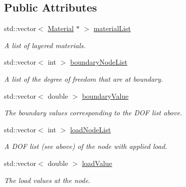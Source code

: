 \subsection*{Public Attributes}
\begin{DoxyCompactItemize}
\item 
\mbox{\label{class_mesh_acc363bc0df381350540ed9d56ba3b35b}} 
std\+::vector$<$ \mbox{\hyperlink{class_material}{Material}} $\ast$ $>$ \mbox{\hyperlink{class_mesh_acc363bc0df381350540ed9d56ba3b35b}{material\+List}}
\begin{DoxyCompactList}\small\item\em A list of layered materials. \end{DoxyCompactList}\item 
std\+::vector$<$ int $>$ \mbox{\hyperlink{class_mesh_a5a1c5739ef85c8f9071f689e790b5251}{boundary\+Node\+List}}
\begin{DoxyCompactList}\small\item\em A list of the degree of freedom that are at boundary. \end{DoxyCompactList}\item 
\mbox{\label{class_mesh_ab331f3e3efeb2934c202b07db8a6c1a5}} 
std\+::vector$<$ double $>$ \mbox{\hyperlink{class_mesh_ab331f3e3efeb2934c202b07db8a6c1a5}{boundary\+Value}}
\begin{DoxyCompactList}\small\item\em The boundary values corresponding to the D\+OF list above. \end{DoxyCompactList}\item 
\mbox{\label{class_mesh_ad54254084b97877bb4d0f9d9d9cbb380}} 
std\+::vector$<$ int $>$ \mbox{\hyperlink{class_mesh_ad54254084b97877bb4d0f9d9d9cbb380}{load\+Node\+List}}
\begin{DoxyCompactList}\small\item\em A D\+OF list (see above) of the node with applied load. \end{DoxyCompactList}\item 
\mbox{\label{class_mesh_a688adb457f52ffa939f53f22afae697e}} 
std\+::vector$<$ double $>$ \mbox{\hyperlink{class_mesh_a688adb457f52ffa939f53f22afae697e}{load\+Value}}
\begin{DoxyCompactList}\small\item\em The load values at the node. \end{DoxyCompactList}\item 

\end{DoxyCompactItemize}
